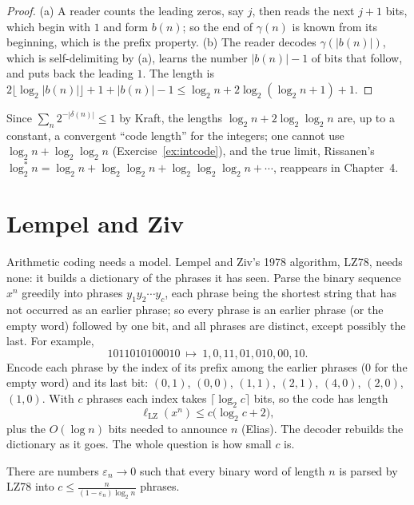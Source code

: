 \begin{proof}
(a) A reader counts the leading zeros, say $j$, then reads the next $j+1$ bits, which begin with $1$ and form $b(n)$; so the end of $\gamma(n)$ is known from its beginning, which is the prefix property. (b) The reader decodes $\gamma(|b(n)|)$, which is self-delimiting by (a), learns the number $|b(n)|-1$ of bits that follow, and puts back the leading $1$. The length is $2\lfloor\log_2|b(n)|\rfloor+1+|b(n)|-1\le\log_2n+2\log_2(\log_2n+1)+1$.
\end{proof}

Since $\sum_n2^{-|\delta(n)|}\le1$ by Kraft, the lengths $\log_2n+2\log_2\log_2n$ are, up to a constant, a convergent ``code length'' for the integers; one cannot use $\log_2n+\log_2\log_2n$ (Exercise~\ref{ex:intcode}), and the true limit, Rissanen's $\log_2^*n=\log_2n+\log_2\log_2n+\log_2\log_2\log_2n+\cdots$, reappears in Chapter~4.

\section{Lempel and Ziv}\label{sec:lz}

Arithmetic coding needs a model. Lempel and Ziv's 1978 algorithm, LZ78, needs none: it builds a dictionary of the phrases it has seen. Parse the binary sequence $x^n$ greedily into phrases $y_1y_2\cdots y_c$, each phrase being the shortest string that has not occurred as an earlier phrase; so every phrase is an earlier phrase (or the empty word) followed by one bit, and all phrases are distinct, except possibly the last. For example,
\[
1011010100010\ \longmapsto\ 1,0,11,01,010,00,10.
\]
Encode each phrase by the index of its prefix among the earlier phrases ($0$ for the empty word) and its last bit: $(0,1)$, $(0,0)$, $(1,1)$, $(2,1)$, $(4,0)$, $(2,0)$, $(1,0)$. With $c$ phrases each index takes $\lceil\log_2c\rceil$ bits, so the code has length
\[
\ell_{\mathrm{LZ}}(x^n)\le c\bigl(\log_2c+2\bigr),
\]
plus the $O(\log n)$ bits needed to announce $n$ (Elias). The decoder rebuilds the dictionary as it goes. The whole question is how small $c$ is.

\begin{lemma}\label{lem:phrases}
There are numbers $\varepsilon_n\to0$ such that every binary word of length $n$ is parsed by LZ78 into $c\le\frac n{(1-\varepsilon_n)\log_2n}$ phrases.
\end{lemma}

